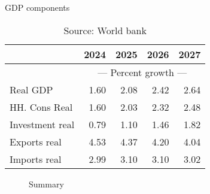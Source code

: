 \documentclass{article}
\begin{document}
\begin{table}[ht]
\caption{GDP components}
\begin{tabular}{lrrrr}
\toprule
 & 2024 & 2025 & 2026 & 2027 \\
\midrule
&\multicolumn{4}{c}{{---  Percent growth ---}}                     \\
Real GDP & 1.60 & 2.08 & 2.42 & 2.64 \\
HH. Cons Real & 1.60 & 2.03 & 2.32 & 2.48 \\
Investment real & 0.79 & 1.10 & 1.46 & 1.82 \\
Exports real & 4.53 & 4.37 & 4.20 & 4.04 \\
Imports real & 2.99 & 3.10 & 3.10 & 3.02 \\
\bottomrule
\end{tabular}
\caption*{Source: World bank }
\end{table}

 
\begin{figure}[htbp]
\centering
\resizebox{\textwidth}{!}{}
\caption{Summary}
\end{figure}
\end{document}
